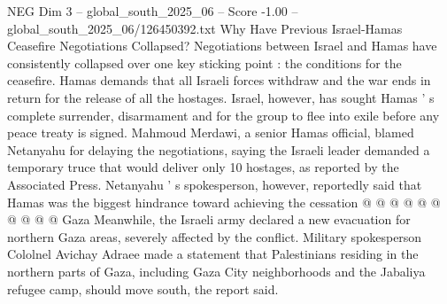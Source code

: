 \begin{textsample}{NEG Dim 3 – global\_south\_2025\_06 – Score -1.00 – global\_south\_2025\_06/126450392.txt}
Why Have Previous Israel-Hamas Ceasefire Negotiations Collapsed?
Negotiations between Israel and Hamas have consistently collapsed over one key sticking point : the conditions for the ceasefire.
Hamas demands that all Israeli forces withdraw and the war ends in return for the release of all the hostages.
Israel, however, has sought Hamas ' s complete surrender, disarmament and for the group to flee into exile before any peace treaty is signed.
Mahmoud Merdawi, a senior Hamas official, blamed Netanyahu for delaying the negotiations, saying the Israeli leader demanded a temporary truce that would deliver only 10 hostages, as reported by the Associated Press.
Netanyahu ' s spokesperson, however, reportedly said that Hamas was the biggest hindrance toward achieving the cessation @ @ @ @ @ @ @ @ @ @ Gaza Meanwhile, the Israeli army declared a new evacuation for northern Gaza areas, severely affected by the conflict.
Military spokesperson Cololnel Avichay Adraee made a statement that Palestinians residing in the northern parts of Gaza, including Gaza City neighborhoods and the Jabaliya refugee camp, should move south, the report said.

\end{textsample}
